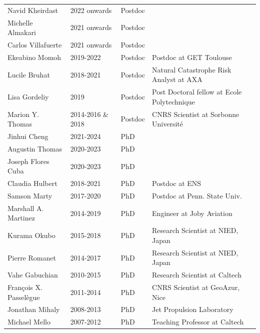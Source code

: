 \documentclass[10pt]{article}
\begin{document}
\begin{table}[h!]
 \renewcommand{\arraystretch}{0.9}
\begin{tabular}{L{4cm}L{3cm}L{2cm}D{6cm}}
\color{groy}Navid Kheirdast       & 2022 onwards      &  Postdoc    &  \\
\color{groy}Michelle Almakari     & 2021 onwards      &  Postdoc    &  \\
\color{groy}Carlos Villafuerte    & 2021 onwards      &  Postdoc    &  \\
\color{gray}Ekeabino Momoh   	  & 2019-2022         &  Postdoc    &  Postdoc at GET Toulouse\\
\color{gray}Lucile Bruhat    	  & 2018-2021         &  Postdoc    &  Natural Catastrophe Risk Analyst at AXA\\
\color{gray}Lisa Gordeliy    	  & 2019              &  Postdoc    &  Post Doctoral fellow at Ecole Polytechnique\\
\color{gray}Marion Y. Thomas 	  & 2014-2016 \& 2018 &  Postdoc    &  CNRS Scientist at Sorbonne Université\\[16pt]
\color{groy}Jinhui Cheng          & 2021-2024		  &  PhD        &   \\
\color{groy}Augustin Thomas       & 2020-2023		  &  PhD        &   \\
\color{groy}Joseph Flores Cuba    & 2020-2023		  &  PhD        &   \\
\color{gray}Claudia Hulbert    	  & 2018-2021         &  PhD        &  Postdoc at ENS\\
\color{gray}Samson Marty    	      & 2017-2020         &  PhD        &  Postdoc at Penn. State Univ.\\
\color{gray}Marshall A. Martinez  & 2014-2019         &  PhD        &  Engineer at Joby Aviation \\
\color{gray}Kurama Okubo    	      & 2015-2018         &  PhD        &  Research Scientist at NIED, Japan\\
\color{gray}Pierre Romanet        & 2014-2017         &  PhD        &  Research Scientist at NIED, Japan\\
\color{gray}Vahe Gabuchian		  & 2010-2015         &  PhD        &  Research Scientist at Caltech\\
\color{gray}François X. Passelègue& 2011-2014         &  PhD        &  CNRS Scientist at GeoAzur, Nice\\
\color{gray}Jonathan Mihaly       & 2008-2013         &  PhD        &  Jet Propulsion Laboratory\\
\color{gray}Michael Mello         & 2007-2012         &  PhD        &  Teaching Professor at Caltech\\[16pt]

\end{tabular}
\end{table}
\end{document}
